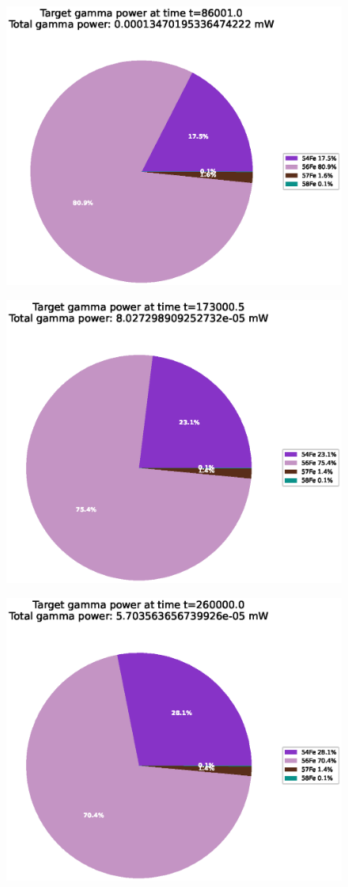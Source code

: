 \begin{figure}[!htb]
\centering
\includegraphics[width=0.8\linewidth]{chapters/activity_code/fe-activity-v2/target-energy/0166_86001.eps}
\caption{}
\label{fig:activity-v2-target-power-86001s}
\end{figure}

\begin{figure}[!htb]
\centering
\includegraphics[width=0.8\linewidth]{chapters/activity_code/fe-activity-v2/target-energy/0233_173000.eps}
\caption{}
\label{fig:activity-v2-target-power-173000s}
\end{figure}

\begin{figure}[!htb]
\centering
\includegraphics[width=0.8\linewidth]{chapters/activity_code/fe-activity-v2/target-energy/0300_260000.eps}
\caption{}
\label{fig:activity-v2-target-power-260000s}
\end{figure}


